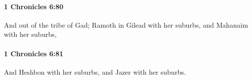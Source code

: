 		\paragraph{1 Chronicles 6:80} %
			\label{1CHRONICLES-6-80}

			And out of the tribe of Gad; Ramoth in Gilead with her suburbs, and Mahanaim with her suburbs,


		\paragraph{1 Chronicles 6:81} %
			\label{1CHRONICLES-6-81}

			And Heshbon with her suburbs, and Jazer with her suburbs.

